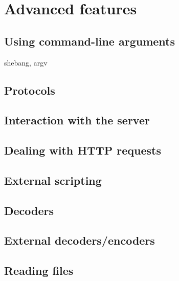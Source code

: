 \chapter{Advanced features}
\section{Using command-line arguments}
shebang, argv

\section{Protocols}

\section{Interaction with the server}

\section{Dealing with HTTP requests}

\section{External scripting}

\section{Decoders}

\section{External decoders/encoders}

\section{Reading files}
